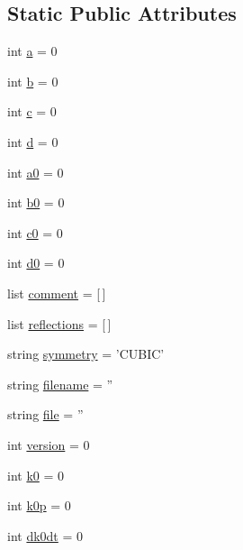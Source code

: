 \subsection*{Static Public Attributes}
\begin{DoxyCompactItemize}
\item 
int \hyperlink{class_j_c_p_d_s_1_1_j_c_p_d_s_a9418ae33987e25bb6cff0c2de64f8b60}{a} = 0
\item 
int \hyperlink{class_j_c_p_d_s_1_1_j_c_p_d_s_a0a05ddd20692ac7885c02090c80ae9b2}{b} = 0
\item 
int \hyperlink{class_j_c_p_d_s_1_1_j_c_p_d_s_a48449d973d4dba83f73cf5da725a9616}{c} = 0
\item 
int \hyperlink{class_j_c_p_d_s_1_1_j_c_p_d_s_a73e6b491c6ebf61ea16474472b57f1fd}{d} = 0
\item 
int \hyperlink{class_j_c_p_d_s_1_1_j_c_p_d_s_aaa0b2a4a0b3ca6a97ea2fc55c905c29f}{a0} = 0
\item 
int \hyperlink{class_j_c_p_d_s_1_1_j_c_p_d_s_af88aaff23be0026b70e55f09a6e73acb}{b0} = 0
\item 
int \hyperlink{class_j_c_p_d_s_1_1_j_c_p_d_s_aba1a3a8c603a94e0b3ed6babbfd09734}{c0} = 0
\item 
int \hyperlink{class_j_c_p_d_s_1_1_j_c_p_d_s_acc2fd1c621c0be8f860827f3006157ee}{d0} = 0
\item 
list \hyperlink{class_j_c_p_d_s_1_1_j_c_p_d_s_a0baef80c76433cded445041b5d0e29d5}{comment} = \mbox{[}$\,$\mbox{]}
\item 
list \hyperlink{class_j_c_p_d_s_1_1_j_c_p_d_s_a4a667612a80191cc64ec7d06c27f4f84}{reflections} = \mbox{[}$\,$\mbox{]}
\item 
string \hyperlink{class_j_c_p_d_s_1_1_j_c_p_d_s_afde1c6e0f66289f1431e29b25df8a6b4}{symmetry} = 'C\-U\-B\-I\-C'
\item 
string \hyperlink{class_j_c_p_d_s_1_1_j_c_p_d_s_a24c99728583d07ecfc59ea617634a333}{filename} = ''
\item 
string \hyperlink{class_j_c_p_d_s_1_1_j_c_p_d_s_a48e76018a03f8c6fd3a7b3dfbccaf0f7}{file} = ''
\item 
int \hyperlink{class_j_c_p_d_s_1_1_j_c_p_d_s_a16bc3288893c02b04d91bd8a3fa315fe}{version} = 0
\item 
int \hyperlink{class_j_c_p_d_s_1_1_j_c_p_d_s_a669f40a36a77a7dab00da06bb5c2ec92}{k0} = 0
\item 
int \hyperlink{class_j_c_p_d_s_1_1_j_c_p_d_s_ac42204eb0a9727b57b1b0957937d60d0}{k0p} = 0
\item 
int \hyperlink{class_j_c_p_d_s_1_1_j_c_p_d_s_a3c24a9159dff627119de99dcdb4379b0}{dk0dt} = 0

\end{DoxyCompactItemize}
